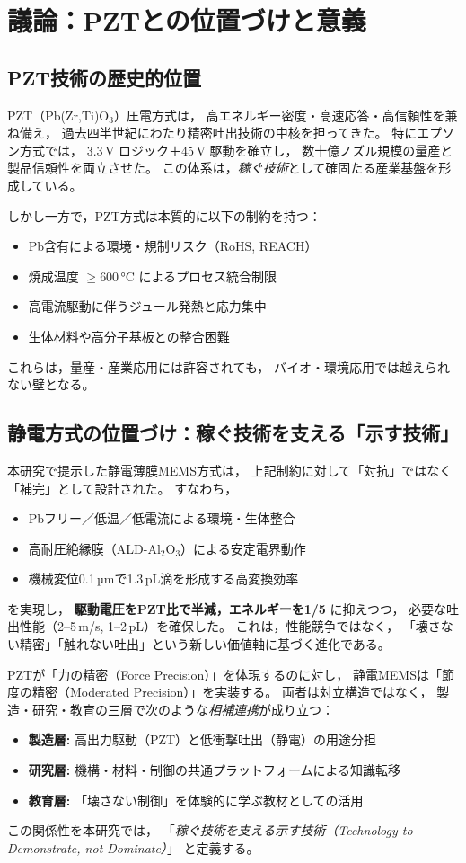 \section{議論：PZTとの位置づけと意義}

\subsection{PZT技術の歴史的位置}
PZT（Pb(Zr,Ti)O$_3$）圧電方式は，
高エネルギー密度・高速応答・高信頼性を兼ね備え，
過去四半世紀にわたり精密吐出技術の中核を担ってきた。
特にエプソン方式では，
3.3\,V ロジック＋45\,V 駆動を確立し，
数十億ノズル規模の量産と製品信頼性を両立させた。
この体系は，\emph{稼ぐ技術}として確固たる産業基盤を形成している。

しかし一方で，PZT方式は本質的に以下の制約を持つ：
\begin{itemize}[leftmargin=6mm]
\item Pb含有による環境・規制リスク（RoHS, REACH）
\item 焼成温度 $\ge$600\,°C によるプロセス統合制限
\item 高電流駆動に伴うジュール発熱と応力集中
\item 生体材料や高分子基板との整合困難
\end{itemize}
これらは，量産・産業応用には許容されても，
バイオ・環境応用では越えられない壁となる。

\subsection{静電方式の位置づけ：稼ぐ技術を支える「示す技術」}
本研究で提示した静電薄膜MEMS方式は，
上記制約に対して「対抗」ではなく「補完」として設計された。
すなわち，
\begin{itemize}[leftmargin=6mm]
\item Pbフリー／低温／低電流による環境・生体整合
\item 高耐圧絶縁膜（ALD-Al$_2$O$_3$）による安定電界動作
\item 機械変位0.1\,µmで1.3\,pL滴を形成する高変換効率
\end{itemize}
を実現し，
\textbf{駆動電圧をPZT比で半減，エネルギーを1/5} に抑えつつ，
必要な吐出性能（2–5\,m/s, 1–2\,pL）を確保した。
これは，性能競争ではなく，
「壊さない精密」「触れない吐出」という新しい価値軸に基づく進化である。

PZTが「力の精密（Force Precision）」を体現するのに対し，
静電MEMSは「節度の精密（Moderated Precision）」を実装する。
両者は対立構造ではなく，
製造・研究・教育の三層で次のような\emph{相補連携}が成り立つ：
\begin{itemize}[leftmargin=6mm]
\item \textbf{製造層:} 高出力駆動（PZT）と低衝撃吐出（静電）の用途分担  
\item \textbf{研究層:} 機構・材料・制御の共通プラットフォームによる知識転移  
\item \textbf{教育層:} 「壊さない制御」を体験的に学ぶ教材としての活用  
\end{itemize}
この関係性を本研究では，
「\emph{稼ぐ技術を支える示す技術（Technology to Demonstrate, not Dominate）}」
と定義する。

